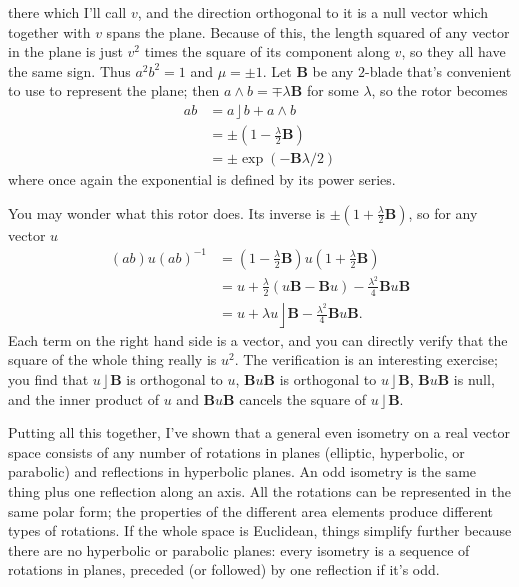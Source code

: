 \documentclass{utarticle}
\newcommand{\bl}[1]{\ensuremath{\bm{#1}}}
\DeclareMathOperator{\lin}{\rfloor}
\DeclareMathOperator{\out}{\wedge}
\begin{document}
\begin{enumerate}
          there which I'll call $v$, and the direction orthogonal to it is a null vector which together with $v$ spans 
          the plane.  Because of this, the length squared of any vector in the plane is just $v^2$ times the square 
          of its component along $v$, so they all have the same sign.  Thus $a^2 b^2 = 1$ and $\mu = \pm1$.  
          Let \bl{B} be any $2$-blade that's convenient to use to represent the plane; then $a \out b = \mp\lambda \bl{B}$ 
          for some $\lambda$, so the rotor becomes
          \begin{align} 
          ab & = a \lin b + a \out b \nonumber \\
                & = \pm\left(1 - \frac{\lambda}{2} \bl{B}\right) \nonumber \\
                & = \pm\exp\left(-\bl{B} \lambda/2\right) 
          \end{align}
          where once again the exponential is defined by its power series.

          You may wonder what this rotor does.  Its inverse is $\pm(1 + \frac{\lambda}{2}\bl{B})$, so for any vector 
          $u$
          \begin{align}
          (ab)u(ab)^{-1} & = \left(1 - \frac{\lambda}{2}\bl{B}\right)u\left(1 + \frac{\lambda}{2}\bl{B}\right) \nonumber \\
                                    & = u + \frac{\lambda}{2}(u\bl{B} - \bl{B}u) - \frac{\lambda^2}{4} \bl{B}u\bl{B} \nonumber \\
                                    & = u + \lambda u \lin \bl{B} - \frac{\lambda^2}{4} \bl{B}u\bl{B}.
          \end{align}
          Each term on the right hand side is a vector, and you can directly verify that the square of the whole thing 
          really is $u^2$.  The verification is an interesting exercise; you find that $u \lin \bl{B}$ is orthogonal to $u$, 
          $\bl{B}u\bl{B}$ is orthogonal to $u \lin \bl{B}$, $\bl{B}u\bl{B}$ is null, and the inner product of $u$ and 
          $\bl{B}u\bl{B}$ cancels the square of $u \lin \bl{B}$. 
\end{enumerate}

Putting all this together, I've shown that a general even isometry on a real vector space consists of any 
number of rotations in planes (elliptic, hyperbolic, or parabolic) and reflections in hyperbolic planes.  An 
odd isometry is the same thing plus one reflection along an axis.  All the rotations can be represented in 
the same polar form; the properties of the different area elements produce different types of rotations.  
If the whole space is Euclidean, things simplify further because there are no hyperbolic or parabolic planes: 
every isometry is a sequence of rotations in planes, preceded (or followed) by one reflection if it's odd.
\end{document}
